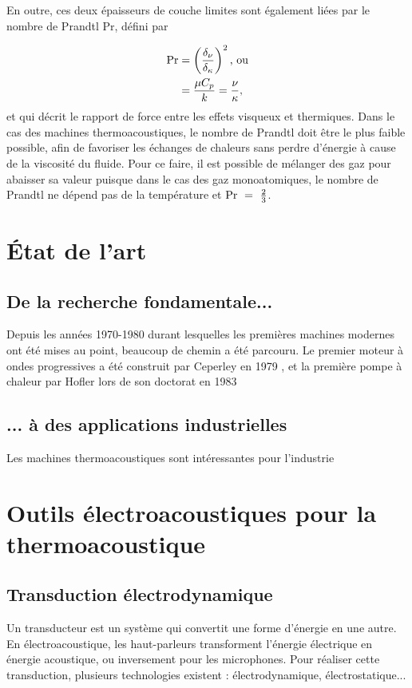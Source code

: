 En outre, ces deux épaisseurs de couche limites sont également liées par le nombre de Prandtl $\mathrm{Pr}$, défini par

\begin{subequations}
	\begin{align}
		\mathrm{Pr} &= \left(\frac{\delta_{\nu}}{\delta_{\kappa}}\right)^2 \text{, ou} \label{eq:Prandtl_delta}\\
				&= \frac{\mu C_{p}}{k} = \frac{\nu}{\kappa}, \label{eq:Prandtl_MuK_NuKappa}
	\end{align}
	\label{eq:Prandtl}%
\end{subequations}
et qui décrit le rapport de force entre les effets visqueux et thermiques. Dans le cas des machines thermoacoustiques, le nombre de Prandtl doit être le plus faible possible, afin de favoriser les échanges de chaleurs sans perdre d'énergie à cause de la viscosité du fluide. Pour ce faire, il est possible de mélanger des gaz pour abaisser sa valeur \cite{belcher_working_1999} puisque dans le cas des gaz monoatomiques, le nombre de Prandtl ne dépend pas de la température et $\mathrm{Pr}~=~\frac{2}{3}$.

\section{\'Etat de l'art}
\subsection{De la recherche fondamentale...}
Depuis les années 1970-1980 durant lesquelles les premières machines modernes ont été mises au point, beaucoup de chemin a été parcouru. Le premier moteur à ondes progressives a été construit par Ceperley en 1979 \cite{ceperley_pistonless_1979}, et la première pompe à chaleur par Hofler lors de son doctorat en 1983 

\subsection{... à des applications industrielles}
Les machines thermoacoustiques sont intéressantes pour l'industrie 

\section{Outils électroacoustiques pour la thermoacoustique}
\subsection{Transduction électrodynamique}
Un transducteur est un système qui convertit une forme d'énergie en une autre. En électroacoustique, les haut-parleurs transforment l'énergie électrique en énergie acoustique, ou inversement pour les microphones. Pour réaliser cette transduction, plusieurs technologies existent : électrodynamique, électrostatique...

